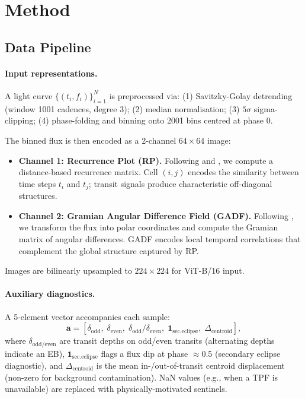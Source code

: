 \documentclass{article}
\begin{document}
\section{Method}
\label{sec:method}

\subsection{Data Pipeline}
\label{sec:data}

\paragraph{Input representations.}
A light curve $\{(t_i, f_i)\}_{i=1}^N$ is preprocessed via:
(1) Savitzky-Golay detrending (window 1001 cadences, degree 3);
(2) median normalisation;
(3) $5\sigma$ sigma-clipping;
(4) phase-folding and binning onto 2001 bins centred at phase 0.

The binned flux is then encoded as a 2-channel $64 \times 64$ image:
\begin{itemize}
  \item \textbf{Channel 1: Recurrence Plot (RP).}
  Following \citet{eckmann1987} and \citet{choudhary2025}, we compute a
  distance-based recurrence matrix.  Cell $(i,j)$ encodes the similarity
  between time steps $t_i$ and $t_j$; transit signals produce characteristic
  off-diagonal structures.

  \item \textbf{Channel 2: Gramian Angular Difference Field (GADF).}
  Following \citet{wang2015}, we transform the flux into polar coordinates and
  compute the Gramian matrix of angular differences.  GADF encodes local
  temporal correlations that complement the global structure captured by RP.
\end{itemize}

Images are bilinearly upsampled to $224 \times 224$ for ViT-B/16 input.

\paragraph{Auxiliary diagnostics.}
A 5-element vector accompanies each sample:
\[
\mathbf{a} = [\delta_\text{odd},\; \delta_\text{even},\; \delta_\text{odd}/\delta_\text{even},\; \mathbf{1}_\text{sec.eclipse},\; \Delta_\text{centroid}],
\]
where $\delta_\text{odd/even}$ are transit depths on odd/even transits
(alternating depths indicate an EB), $\mathbf{1}_\text{sec.eclipse}$ flags a
flux dip at phase $\approx$0.5 (secondary eclipse diagnostic), and
$\Delta_\text{centroid}$ is the mean in-/out-of-transit centroid displacement
(non-zero for background contamination).
NaN values (e.g., when a TPF is unavailable) are replaced with
physically-motivated sentinels.
\end{document}
